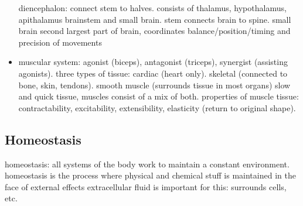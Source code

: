 \begin{itemize}
        diencephalon: connect stem to halves. consists of thalamus, hypothalamus, apithalamus
        brainstem and small brain. stem connects brain to spine. small brain second largest part of brain, coordinates balance/position/timing and precision of movements
    \item muscular system: agonist (biceps), antagonist (triceps), synergist (assisting agonists).
        three types of tissue: cardiac (heart only). skeletal (connected to bone, skin, tendons). smooth muscle (surrounds tissue in most organs)
        slow and quick tissue, muscles consist of a mix of both.
        properties of muscle tissue: contractability, excitability, extensibility, elasticity (return to original shape).
\end{itemize}

\subsection{Homeostasis}
homeostasis: all systems of the body work to maintain a constant environment. homeostasis is the process where physical and chemical stuff is maintained in the face of external effects
extracellular fluid is important for this: surrounds cells, etc.
